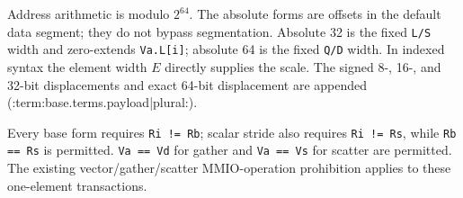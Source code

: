 Address arithmetic is modulo $2^{64}$.  The absolute forms are offsets in the
default data segment; they do not bypass segmentation.  Absolute 32 is the
fixed \texttt{L/S} width and zero-extends \texttt{Va.L[i]}; absolute 64 is the
fixed \texttt{Q/D} width. In indexed syntax the element width $E$ directly
supplies the scale. The signed 8-, 16-, and 32-bit
displacements and exact 64-bit displacement are appended (:term:base.terms.payload|plural:).

Every base form requires \texttt{Ri != Rb}; scalar stride also requires
\texttt{Ri != Rs}, while \texttt{Rb == Rs} is permitted.  \texttt{Va == Vd}
for gather and \texttt{Va == Vs} for scatter are permitted.  The existing
vector/gather/scatter MMIO-operation prohibition applies to these one-element
transactions.
